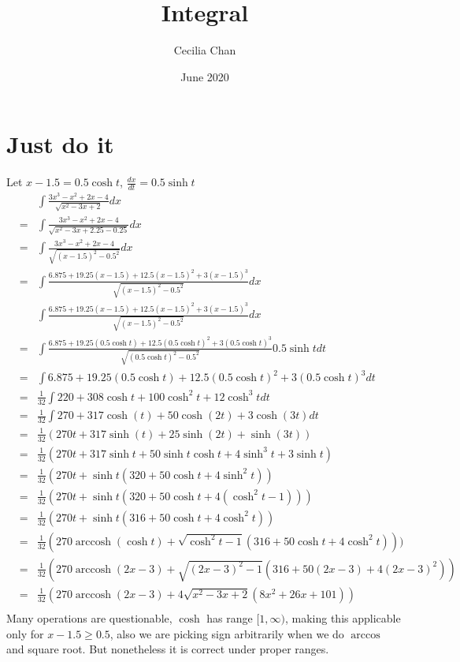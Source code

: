 \documentclass{article}
\title{Integral}
\author{Cecilia Chan}
\date{June 2020}
\DeclareMathOperator{\arccosh}{arccosh}
\begin{document}
\maketitle
\section{Just do it}
Let $ x - 1.5 = 0.5 \cosh t $, $ \frac{dx}{dt} = 0.5 \sinh t $
\begin{eqnarray*}
  & & \int{\frac{3x^3 - x^2 + 2x - 4}{\sqrt{x^2 - 3x + 2}}dx} \\
  &=& \int{\frac{3x^3 - x^2 + 2x - 4}{\sqrt{x^2 - 3x + 2.25 - 0.25}}dx} \\
  &=& \int{\frac{3x^3 - x^2 + 2x - 4}{\sqrt{(x - 1.5)^2 - 0.5^2}}dx} \\
  &=& \int{\frac{6.875 + 19.25 (x - 1.5) + 12.5 (x - 1.5)^2 + 3 (x - 1.5)^3}{\sqrt{(x - 1.5)^2 - 0.5^2}}dx} \\
  & & \int{\frac{6.875 + 19.25 (x - 1.5) + 12.5 (x - 1.5)^2 + 3 (x - 1.5)^3}{\sqrt{(x - 1.5)^2 - 0.5^2}}dx} \\
  &=& \int{\frac{6.875 + 19.25 (0.5 \cosh t) + 12.5 (0.5 \cosh t)^2 + 3 (0.5 \cosh t)^3}{\sqrt{(0.5 \cosh t)^2 - 0.5^2}}0.5 \sinh t dt } \\
  &=& \int{6.875 + 19.25 (0.5 \cosh t) + 12.5 (0.5 \cosh t)^2 + 3 (0.5 \cosh t)^3 dt } \\
  &=& \frac{1}{32}\int{220 + 308 \cosh t + 100 \cosh^2 t + 12 \cosh^3 t dt } \\
  &=& \frac{1}{32}\int{270 + 317 \cosh(t) + 50 \cosh(2 t) + 3\cosh(3t) dt} \\
  &=& \frac{1}{32}(270t + 317 \sinh(t) + 25 \sinh(2t) + \sinh(3t)) \\
  &=& \frac{1}{32}(270t + 317 \sinh t + 50 \sinh t\cosh t + 4\sinh^3 t + 3\sinh t) \\
  &=& \frac{1}{32}(270t + \sinh t(320 + 50 \cosh t + 4\sinh^2 t)) \\
  &=& \frac{1}{32}(270t + \sinh t(320 + 50 \cosh t + 4(\cosh^2 t - 1))) \\
  &=& \frac{1}{32}(270t + \sinh t(316 + 50 \cosh t + 4\cosh^2 t)) \\
  &=& \frac{1}{32}(270\arccosh(\cosh t) + \sqrt{\cosh^2 t - 1}(316 + 50 \cosh t + 4\cosh^2 t))) \\
  &=& \frac{1}{32}(270\arccosh(2x - 3) + \sqrt{(2x - 3)^2 - 1}(316 + 50 (2x - 3) + 4(2x - 3)^2)) \\
  &=& \frac{1}{32}(270\arccosh(2x - 3) + 4\sqrt{x^2 - 3x + 2}(8x^2 + 26x + 101)) \\
\end{eqnarray*}
Many operations are questionable, $ \cosh $ has range $ [1, \infty) $, making this applicable only for $ x - 1.5 \geq 0.5 $, also we are picking sign arbitrarily when we do $ \arccos $ and square root. But nonetheless it is correct under proper ranges.
\end{document}
